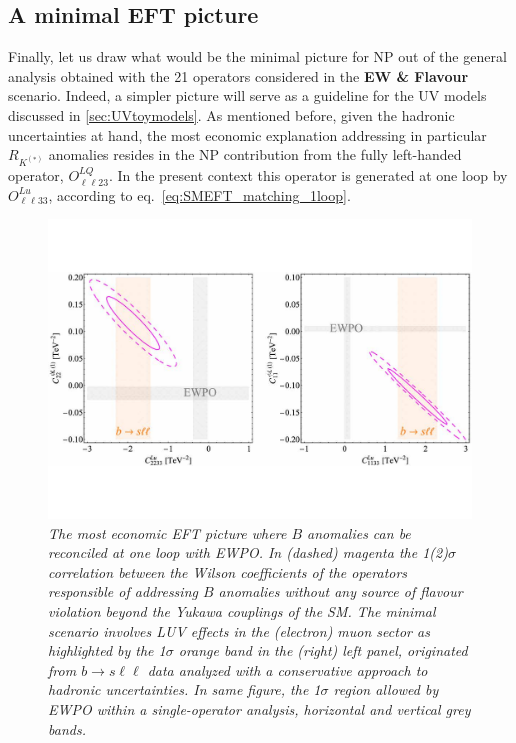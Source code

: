\subsection{A minimal EFT picture}
Finally, let us draw what would be the minimal picture for NP out of the general analysis obtained with the 21 operators considered in the {\bf EW \& Flavour} scenario. Indeed, a simpler picture will serve as a guideline for the UV models discussed in \autoref{sec:UVtoymodels}. 
As mentioned before, given the hadronic uncertainties at hand, the most economic explanation addressing in particular $R_{K^{(*)}}$ anomalies resides in the NP contribution from the fully left-handed operator, $O^{LQ}_{\ell \ell 2 3}$. In the present context this operator is generated at one loop by $O^{Lu}_{\ell \ell 3 3}$, according to eq.~\eqref{eq:SMEFT_matching_1loop}.

\begin{figure}[tp]
	\includegraphics[width=\textwidth]{figures/CHL_CLu.pdf}
	\caption{\it The most economic EFT picture where $B$ anomalies can be reconciled at one loop with EWPO. In (dashed) magenta the 1(2)$\sigma$ correlation between the Wilson coefficients of the operators responsible of addressing $B$ anomalies without any source of flavour violation beyond the Yukawa couplings of the SM. The minimal scenario involves LUV effects in the (electron) muon sector as highlighted by the 1$\sigma$ orange band in the (right) left panel, originated from $b \to s \ell \ell$ data analyzed with a conservative approach to hadronic uncertainties. In same figure, the 1$\sigma$ region allowed by EWPO within a single-operator analysis, horizontal and vertical grey bands.}    
	\label{fig:2D_correlations}
\end{figure}

